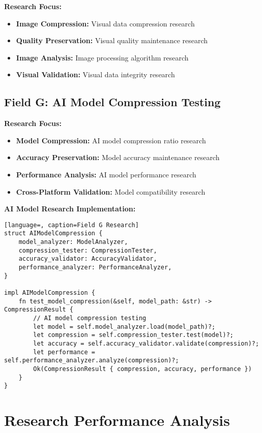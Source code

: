 \documentclass[12pt,a4paper]{article}
\begin{document}
\textbf{Research Focus:}
\begin{itemize}
    \item \textbf{Image Compression:} Visual data compression research
    \item \textbf{Quality Preservation:} Visual quality maintenance research
    \item \textbf{Image Analysis:} Image processing algorithm research
    \item \textbf{Visual Validation:} Visual data integrity research
\end{itemize}

\subsection{Field G: AI Model Compression Testing}

\textbf{Research Focus:}
\begin{itemize}
    \item \textbf{Model Compression:} AI model compression ratio research
    \item \textbf{Accuracy Preservation:} Model accuracy maintenance research
    \item \textbf{Performance Analysis:} AI model performance research
    \item \textbf{Cross-Platform Validation:} Model compatibility research
\end{itemize}

\textbf{AI Model Research Implementation:}
\begin{lstlisting}[language=, caption=Field G Research]
struct AIModelCompression {
    model_analyzer: ModelAnalyzer,
    compression_tester: CompressionTester,
    accuracy_validator: AccuracyValidator,
    performance_analyzer: PerformanceAnalyzer,
}

impl AIModelCompression {
    fn test_model_compression(&self, model_path: &str) -> CompressionResult {
        // AI model compression testing
        let model = self.model_analyzer.load(model_path)?;
        let compression = self.compression_tester.test(model)?;
        let accuracy = self.accuracy_validator.validate(compression)?;
        let performance = self.performance_analyzer.analyze(compression)?;
        Ok(CompressionResult { compression, accuracy, performance })
    }
}
\end{lstlisting}

\section{Research Performance Analysis}
\end{document}
